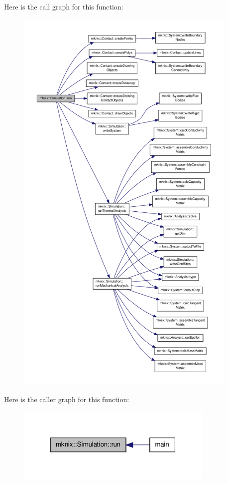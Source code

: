 Here is the call graph for this function\-:\nopagebreak
\begin{figure}[H]
\begin{center}
\leavevmode
\includegraphics[height=550pt]{db/d0b/classmknix_1_1_simulation_a616f0712431201275269aa05eadb8779_cgraph}
\end{center}
\end{figure}




Here is the caller graph for this function\-:\nopagebreak
\begin{figure}[H]
\begin{center}
\leavevmode
\includegraphics[width=268pt]{db/d0b/classmknix_1_1_simulation_a616f0712431201275269aa05eadb8779_icgraph}
\end{center}
\end{figure}


